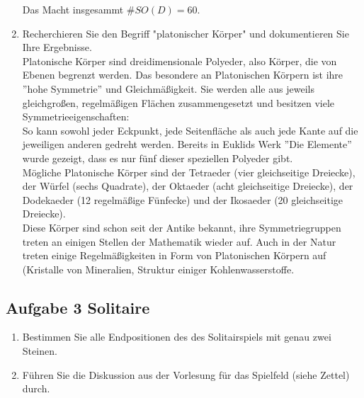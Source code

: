 \documentclass[11pt,a4paper,ngerman]{article}
\begin{document}
\begin{enumerate}[\bfseries (a)]
Das Macht insgesammt $\# SO(D) = 60$. 

\item Recherchieren Sie den Begriff "platonischer Körper" {} und dokumentieren Sie Ihre Ergebnisse.\\

Platonische Körper sind dreidimensionale Polyeder, also Körper, die von Ebenen begrenzt werden. Das besondere an Platonischen Körpern ist ihre ''hohe Symmetrie'' und Gleichmäßigkeit. Sie werden alle aus jeweils gleichgroßen, regelmäßigen Flächen zusammengesetzt und besitzen viele Symmetrieeigenschaften:\\
So kann sowohl jeder Eckpunkt, jede Seitenfläche als auch jede Kante auf die jeweiligen anderen gedreht werden. Bereits in Euklids Werk ''Die Elemente'' wurde gezeigt, dass es nur fünf dieser speziellen Polyeder gibt.
\\Mögliche Platonische Körper sind der Tetraeder (vier gleichseitige Dreiecke), der Würfel (sechs Quadrate), der Oktaeder (acht gleichseitige Dreiecke), der Dodekaeder (12 regelmäßige Fünfecke) und der Ikosaeder (20 gleichseitige Dreiecke).
\\Diese Körper sind schon seit der Antike bekannt, ihre Symmetriegruppen treten an einigen Stellen der Mathematik wieder auf. Auch in der Natur treten einige Regelmäßigkeiten in Form von Platonischen Körpern auf (Kristalle von Mineralien, Struktur einiger Kohlenwasserstoffe.
\end{enumerate}

\subsection*{Aufgabe 3 \mdseries Solitaire}

\begin{enumerate}[\bfseries (a)]

\item Bestimmen Sie alle Endpositionen des des Solitairspiels mit genau zwei Steinen.


\item Führen Sie die Diskussion aus der Vorlesung für das Spielfeld (siehe Zettel) durch.

\end{enumerate}

\label{LastPage}
\end{document}
